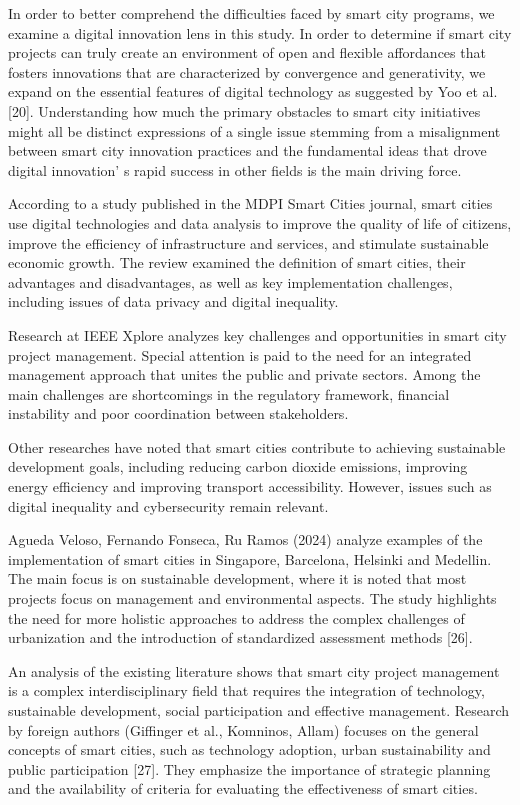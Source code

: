 \begin{multicols}{2}
In order to better comprehend the difficulties faced by smart city
programs, we examine a digital innovation lens in this study. In order
to determine if smart city projects can truly create an environment of
open and flexible affordances that fosters innovations that are
characterized by convergence and generativity, we expand on the
essential features of digital technology as suggested by Yoo et al.
{[}20{]}. Understanding how much the primary obstacles to smart city
initiatives might all be distinct expressions of a single issue stemming
from a misalignment between smart city innovation practices and the
fundamental ideas that drove digital innovation' s rapid
success in other fields is the main driving force.

According to a study published in the MDPI Smart Cities journal, smart
cities use digital technologies and data analysis to improve the quality
of life of citizens, improve the efficiency of infrastructure and
services, and stimulate sustainable economic growth. The review examined
the definition of smart cities, their advantages and disadvantages, as
well as key implementation challenges, including issues of data privacy
and digital inequality.

Research at IEEE Xplore analyzes key challenges and opportunities in
smart city project management. Special attention is paid to the need for
an integrated management approach that unites the public and private
sectors. Among the main challenges are shortcomings in the regulatory
framework, financial instability and poor coordination between
stakeholders.

Other researches have noted that smart cities contribute to achieving
sustainable development goals, including reducing carbon dioxide
emissions, improving energy efficiency and improving transport
accessibility. However, issues such as digital inequality and
cybersecurity remain relevant.

Agueda Veloso, Fernando Fonseca, Ru Ramos (2024) analyze examples of the
implementation of smart cities in Singapore, Barcelona, Helsinki and
Medellin. The main focus is on sustainable development, where it is
noted that most projects focus on management and environmental aspects.
The study highlights the need for more holistic approaches to address
the complex challenges of urbanization and the introduction of
standardized assessment methods {[}26{]}.

An analysis of the existing literature shows that smart city project
management is a complex interdisciplinary field that requires the
integration of technology, sustainable development, social participation
and effective management. Research by foreign authors (Giffinger et al.,
Komninos, Allam) focuses on the general concepts of smart cities, such
as technology adoption, urban sustainability and public participation
{[}27{]}. They emphasize the importance of strategic planning and the
availability of criteria for evaluating the effectiveness of smart
cities.


\end{multicols}
